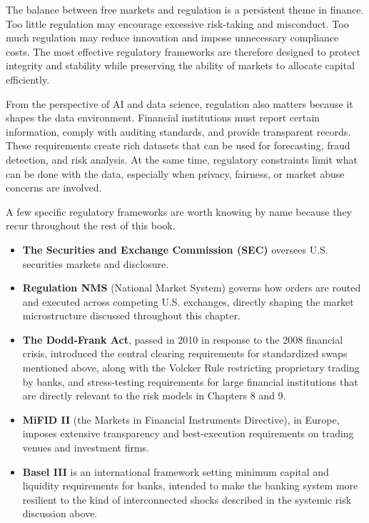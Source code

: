 \documentclass[../ai_in_finance]{subfiles}
\begin{document}
The balance between free markets and regulation is a persistent theme in finance. Too little regulation may encourage excessive risk-taking and misconduct. Too much regulation may reduce innovation and impose unnecessary compliance costs. The most effective regulatory frameworks are therefore designed to protect integrity and stability while preserving the ability of markets to allocate capital efficiently.

From the perspective of AI and data science, regulation also matters because it shapes the data environment. Financial institutions must report certain information, comply with auditing standards, and provide transparent records. These requirements create rich datasets that can be used for forecasting, fraud detection, and risk analysis. At the same time, regulatory constraints limit what can be done with the data, especially when privacy, fairness, or market abuse concerns are involved.

A few specific regulatory frameworks are worth knowing by name because they recur throughout the rest of this book.

\begin{itemize}
    \item \textbf{The Securities and Exchange Commission (SEC)} oversees U.S. securities markets and disclosure.
    \item \textbf{Regulation NMS} (National Market System) governs how orders are routed and executed across competing U.S. exchanges, directly shaping the market microstructure discussed throughout this chapter.
    \item \textbf{The Dodd-Frank Act}, passed in 2010 in response to the 2008 financial crisis, introduced the central clearing requirements for standardized swaps mentioned above, along with the Volcker Rule restricting proprietary trading by banks, and stress-testing requirements for large financial institutions that are directly relevant to the risk models in Chapters 8 and 9.
    \item \textbf{MiFID II} (the Markets in Financial Instruments Directive), in Europe, imposes extensive transparency and best-execution requirements on trading venues and investment firms.
    \item \textbf{Basel III} is an international framework setting minimum capital and liquidity requirements for banks, intended to make the banking system more resilient to the kind of interconnected shocks described in the systemic risk discussion above.
\end{itemize}
\end{document}
